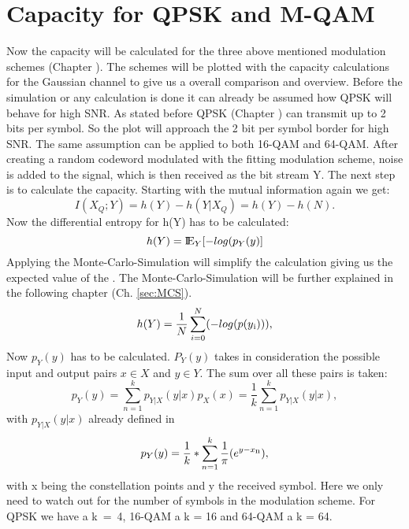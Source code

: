 \section{Capacity for QPSK and M-QAM}
Now the capacity will be calculated for the three above mentioned modulation schemes (Chapter ). The schemes will be plotted with the capacity calculations for the Gaussian channel to give us a overall comparison and overview.
\newline
Before the simulation or any calculation is done it can already be assumed how QPSK will behave for high SNR. As stated before QPSK (Chapter ) can transmit up to 2 bits per symbol. So the plot will approach the 2 bit per symbol border for high SNR. The same assumption can be applied to both 16-QAM and 64-QAM.
After creating a random codeword modulated with the fitting modulation scheme, noise is added to the signal, which is then received as the bit stream Y. The next step is to calculate the capacity. 
\newline
Starting with the mutual information again we get:
\begin{equation}
I(X_Q;Y) = h(Y) - h(Y|X_Q) = h(Y) - h(N).
\end{equation}
Now the differential entropy for h(Y) has to be calculated: 
\begin{equation}
\label{eq:MCEntropy}
h(Y) = {\mbox{I\negthinspace E}}_Y[-log(p_Y(y)]
\end{equation}
Applying the Monte-Carlo-Simulation will simplify the calculation giving us the expected value of the . The Monte-Carlo-Simulation will be further explained in the following chapter (Ch. \ref{sec:MCS}).
\begin{equation}
\label{eq:entropy1}
h(Y) =  \frac{1}{N}\sum_{i=0}^N(-log(p(y\textsubscript{i}))),
\end{equation} 
Now $p_Y(y)$ has to be calculated. $P_Y(y)$ takes in consideration the possible input and output pairs $x \in X$ and $y \in Y$. The sum over all these pairs is taken:
\begin{equation}
\label{eq:entropy2.1}
p_Y(y) = \sum_{n=1}^{k}p_{Y|X}(y|x)p_X(x) = \frac{1}{k}\sum_{n=1}^{k}p_{Y|X}(y|x), 
\end{equation}
with $p_{Y|X}(y|x)$ already defined in  
\begin{equation}
\label{eq:entropy2}
p_Y(y) = \frac{1}{k}*\sum_{n=1}^{k}\frac{1}{\pi}(e^{y-x\textsubscript{n}}),
\end{equation} 
with x being the constellation points and y the received symbol.
Here we only need to watch out for the number of symbols in the modulation scheme. For QPSK we have a \mbox{k = 4}, 16-QAM a k = 16 and 64-QAM a k = 64.
\newline
